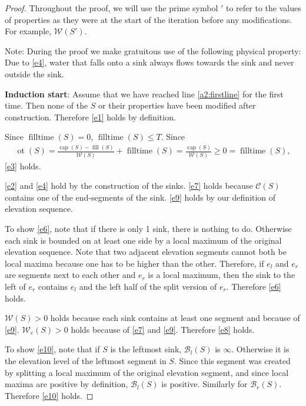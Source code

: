 \documentclass[11pt,a4paper]{article}
\DeclareMathOperator{\capp}{cap}
\DeclareMathOperator{\ot}{ot}
\DeclareMathOperator{\Fill}{fill}
\DeclareMathOperator{\filltime}{filltime}
\begin{document}
\begin{proof}
Throughout the proof, we will use the prime symbol $'$ to refer to the values of properties as they were at the start of the iteration before any modifications.
For example, $\mathcal{W}(S')$.

Note: During the proof we make gratuitous use of the following physical property:
Due to \ref{e4}, water that falls onto a sink always flows towards the sink and never outside the sink.

\textbf{Induction start}: Assume that we have reached line \ref{a2:firstline} for the first time.
Then none of the $S$ or their properties have been modified after construction.
Therefore \ref{e1} holds by definition.

Since $\filltime(S) = 0$, $\filltime(S) \le T$.
Since
\begin{align*}
    \ot(S) = \frac{\capp(S) - \Fill(S)}{\mathcal{W}(S)} + \filltime(S)
           = \frac{\capp(S)}{\mathcal{W}(S)}
           \ge 0 = \filltime(S),
\end{align*}
\ref{e3} holds.

\ref{e2} and \ref{e4} hold by the construction of the sinks. 
\ref{e7} holds because $\mathcal{C}(S)$ contains one of the end-segments of the sink.
\ref{e9} holds by our definition of elevation sequence.

To show \ref{e6}, note that if there is only 1 sink, there is nothing to do.
Otherwise each sink is bounded on at least one side by a local maximum of the original elevation sequence.
Note that two adjacent elevation segments cannot both be local maxima because one has to be higher than the other.
Therefore, if $e_l$ and $e_r$ are segments next to each other and $e_r$ is a local maximum, then
the sink to the left of $e_r$ contains $e_l$ and the left half of the split version of $e_r$.
Therefore \ref{e6} holds.

$\mathcal{W}(S) > 0$ holds because each sink contains at least one segment and because of \ref{e9}.
$\mathcal{W}_c(S) > 0$ holds because of \ref{e7} and \ref{e9}.
Therefore \ref{e8} holds.

To show \ref{e10}, note that if $S$ is the leftmost sink, $\mathcal{B}_l(S)$ is $\infty$.
Otherwise it is the elevation level of the leftmost segment in $S$.
Since this segment was created by splitting a local maximum of the original elevation segment, and since local maxima are positive by definition, $\mathcal{B}_l(S)$ is positive.
Similarly for $\mathcal{B}_r(S)$.
Therefore \ref{e10} holds.


\end{proof}
\end{document}
